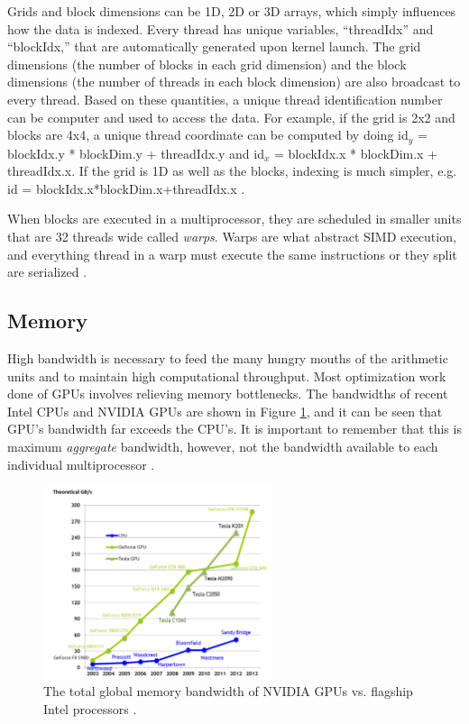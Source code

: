 Grids and block dimensions can be 1D, 2D or 3D arrays, which simply influences how the data is indexed.  Every thread has unique variables, ``threadIdx'' and ``blockIdx,'' that are automatically generated upon kernel launch.  The grid dimensions (the number of blocks in each grid dimension) and the block dimensions (the number of threads in each block dimension) are also broadcast to every thread.  Based on these quantities, a unique thread identification number can be computer and used to access the data.   For example, if the grid is 2x2 and blocks are 4x4, a unique thread coordinate can be computed by doing id$_y$ = blockIdx.y * blockDim.y + threadIdx.y and id$_x$ = blockIdx.x * blockDim.x + threadIdx.x.  If the grid is 1D as well as the blocks, indexing is much simpler, e.g. id = blockIdx.x*blockDim.x+threadIdx.x \cite{cuda}.

When blocks are executed in a multiprocessor, they are scheduled in smaller units that are 32 threads wide called \emph{warps}.  Warps are what abstract SIMD execution, and everything thread in a warp must execute the same instructions or they split are serialized \cite{cuda}.

\subsection{Memory}

High bandwidth is necessary to feed the many hungry mouths of the arithmetic units and to maintain high computational throughput.  Most optimization work done of GPUs involves relieving memory bottlenecks.  The bandwidths of recent Intel CPUs and NVIDIA GPUs are shown in Figure \ref{bandwidth}, and it can be seen that GPU's bandwidth far exceeds the CPU's.  It is important to remember that this is maximum \emph{aggregate} bandwidth, however, not the bandwidth available to each individual multiprocessor \cite{cuda}.   

\begin{figure}[h!] 
  \centering
    \includegraphics[width=0.6\textwidth]{graphics/memory_bandwidth.pdf}
     \caption[The total global memory bandwidth of NVIDIA GPUs vs. flagship Intel processors.]{The total global memory bandwidth of NVIDIA GPUs vs. flagship Intel processors \cite{cuda}. \label{bandwidth}}
\end{figure}

